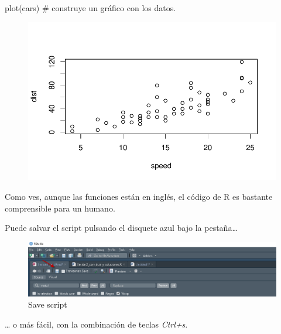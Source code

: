 \documentclass[
  letterpaper,
  DIV=11,
  numbers=noendperiod]{scrreprt}
\newenvironment{Shaded}{\begin{snugshade}}{\end{snugshade}}
\newcommand{\CommentTok}[1]{\textcolor[rgb]{0.37,0.37,0.37}{#1}}
\newcommand{\FunctionTok}[1]{\textcolor[rgb]{0.28,0.35,0.67}{#1}}
\newcommand{\NormalTok}[1]{\textcolor[rgb]{0.00,0.23,0.31}{#1}}
\begin{document}
\begin{Shaded}
\begin{Highlighting}[]
\FunctionTok{plot}\NormalTok{(cars) }\CommentTok{\# construye un gráfico con los datos.}
\end{Highlighting}
\end{Shaded}

\begin{figure}[H]

{\centering \includegraphics{./PR_1_lect_files/figure-pdf/unnamed-chunk-1-1.pdf}

}

\end{figure}

Como ves, aunque las funciones están en inglés, el código de R es
bastante comprensible para un humano.

Puede salvar el script pulsando el disquete azul bajo la pestaña\ldots{}

\begin{figure}

{\centering \includegraphics{./pics/Salvar_script.png}

}

\caption{Save script}

\end{figure}

\ldots{} o más fácil, con la combinación de teclas \emph{Ctrl+s}.
\end{document}
